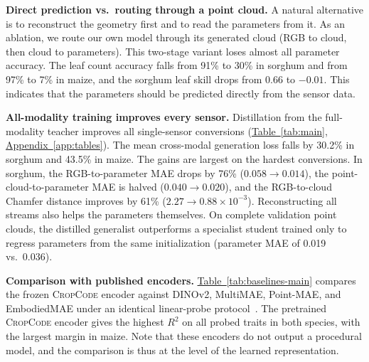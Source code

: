 \documentclass[10pt,twocolumn,letterpaper]{article}
\newcommand{\tabref}[1]{\hyperref[#1]{Table~\ref*{#1}}}
\newcommand{\appendixref}[1]{\hyperref[#1]{Appendix~\ref*{#1}}}
\newcommand{\method}{\textup{\textsc{CropCode}}}   %
\begin{document}
\noindent\textbf{Direct prediction vs.\ routing through a point cloud.}
A natural alternative is to reconstruct the geometry first and to read the parameters from it. As an ablation, we route our own model through its generated cloud (RGB to cloud, then cloud to parameters). This two-stage variant loses almost all parameter accuracy. The leaf count accuracy falls from 91\% to 30\% in sorghum and from 97\% to 7\% in maize, and the sorghum leaf skill drops from 0.66 to $-0.01$. This indicates that the parameters should be predicted directly from the sensor data.

\noindent\textbf{All-modality training improves every sensor.}
Distillation from the full-modality teacher improves all single-sensor conversions (\tabref{tab:main}, \appendixref{app:tables}). The mean cross-modal generation loss falls by 30.2\% in sorghum and 43.5\% in maize. The gains are largest on the hardest conversions. In sorghum, the RGB-to-parameter MAE drops by 76\% ($0.058 \to 0.014$), the point-cloud-to-parameter MAE is halved ($0.040 \to 0.020$), and the RGB-to-cloud Chamfer distance improves by 61\% ($2.27 \to 0.88 \times 10^{-3}$). Reconstructing all streams also helps the parameters themselves. On complete validation point clouds, the distilled generalist outperforms a specialist student trained only to regress parameters from the same initialization (parameter MAE of 0.019 vs.\ 0.036).

\noindent\textbf{Comparison with published encoders.}
\tabref{tab:baselines-main} compares the frozen \method{} encoder against DINOv2, MultiMAE, Point-MAE, and EmbodiedMAE under an identical linear-probe protocol~\citep{chen2020simclr}. The pretrained \method{} encoder gives the highest $R^2$ on all probed traits in both species, with the largest margin in maize. Note that these encoders do not output a procedural model, and the comparison is thus at the level of the learned representation.
\end{document}
